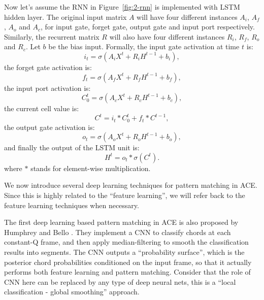 Now let's assume the RNN in Figure~\ref{fig:2-rnn} is implemented with LSTM hidden layer. The original input matrix $A$ will have four different instances $A_i$, $A_f$, $A_o$ and $A_c$, for input gate, forget gate, output gate and input port respectively. Similarly, the recurrent matrix $R$ will also have four different instances $R_i$, $R_f$, $R_o$ and $R_c$. Let $b$ be the bias input. Formally, the input gate activation at time $t$ is:
\begin{equation}
i_t = \sigma(A_iX^t + R_iH^{t-1}+b_i),
\end{equation}
the forget gate activation is:
\begin{equation}
f_t = \sigma(A_fX^t + R_fH^{t-1}+b_f),
\end{equation}
the input port activation is:
\begin{equation}
C^t_0 = \sigma(A_cX^t + R_cH^{t-1}+b_c),
\end{equation}
the current cell value is:
\begin{equation}
C^t = i_t*C^t_0 + f_t*C^{t-1},
\end{equation}
the output gate activation is:
\begin{equation}
o_t = \sigma(A_oX^t + R_oH^{t-1}+b_o),
\end{equation}
and finally the output of the LSTM unit is:
\begin{equation}
H^t = o_t*\sigma(C^t).
\end{equation}
where $*$ stands for element-wise multiplication.

We now introduce several deep learning techniques for pattern matching in ACE. Since this is highly related to the ``feature learning'', we will refer back to the feature learning techniques when necessary.

The first deep learning based pattern matching in ACE is also proposed by Humphrey and Bello \cite{humphrey2012rethinking}. They implement a CNN to classify chords at each constant-Q frame, and then apply median-filtering to smooth the classification results into segments. The CNN outputs a ``probability surface'', which is the posterior chord probabilities conditioned on the input frame, so that it actually performs both feature learning and pattern matching. Consider that the role of CNN here can be replaced by any type of deep neural nets, this is a ``local classification - global smoothing'' approach.

